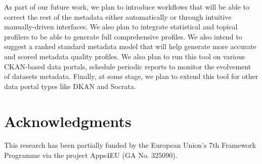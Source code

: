 \documentclass[runningheads,a4paper]{../../Util/LaTEX/llncs}
\begin{document}
As part of our future work, we plan to introduce workflows that will be able to correct the rest of the metadata either automatically or through intuitive manually-driven interfaces. We also plan to integrate statistical and topical profilers to be able to generate full comprehensive profiles. We also intend to suggest a ranked standard metadata model that will help generate more accurate and scored metadata quality profiles. We also plan to run this tool on various CKAN-based data portals, schedule periodic reports to monitor the evolvement of datasets metadata. Finally, at some stage, we plan to extend this tool for other data portal types like DKAN and Socrata.


\section*{Acknowledgments}
This research has been partially funded by the European Union's 7th Framework Programme via the project Apps4EU (GA No. 325090).
\vspace{0.5cm}



\end{document}

